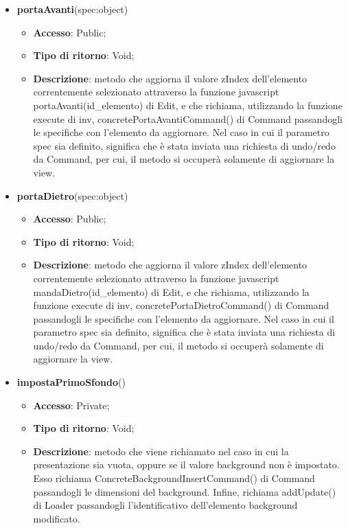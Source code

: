 {{\begin{itemize}
\begin{itemize}
			\end{itemize}
			\item \textbf{portaAvanti}(spec:object)
			\begin{itemize}
				\item \textbf{Accesso}: Public;
				\item \textbf{Tipo di ritorno}: Void;
				\item \textbf{Descrizione}: metodo che aggiorna il valore zIndex dell'elemento correntemente selezionato attraverso la funzione javascript portaAvanti(id\_elemento) di Edit, e che richiama, utilizzando la funzione execute di inv, concretePortaAvantiCommand() di Command passandogli le specifiche con l'elemento da aggiornare. Nel caso in cui il parametro spec sia definito, significa che è stata inviata una richiesta di undo/redo da Command, per cui, il metodo si occuperà solamente di aggiornare la view.
			\end{itemize}
			\item \textbf{portaDietro}(spec:object)
			\begin{itemize}
				\item \textbf{Accesso}: Public;
				\item \textbf{Tipo di ritorno}: Void;
				\item \textbf{Descrizione}: metodo che aggiorna il valore zIndex dell'elemento correntemente selezionato attraverso la funzione javascript mandaDietro(id\_elemento) di Edit, e che richiama, utilizzando la funzione execute di inv, concretePortaDietroCommand() di Command passandogli le specifiche con l'elemento da aggiornare. Nel caso in cui il parametro spec sia definito, significa che è stata inviata una richiesta di undo/redo da Command, per cui, il metodo si occuperà solamente di aggiornare la view.
			\end{itemize}
			\item \textbf{impostaPrimoSfondo}()
			\begin{itemize}
				\item \textbf{Accesso}: Private;
				\item \textbf{Tipo di ritorno}: Void;
				\item \textbf{Descrizione}: metodo che viene richiamato nel caso in cui la presentazione sia vuota, oppure se il valore background non è impostato. Esso richiama ConcreteBackgroundInsertCommand() di Command passandogli le dimensioni del background. Infine, richiama addUpdate() di Loader passandogli l'identificativo dell'elemento background modificato.
			\end{itemize}

\end{itemize}}}
